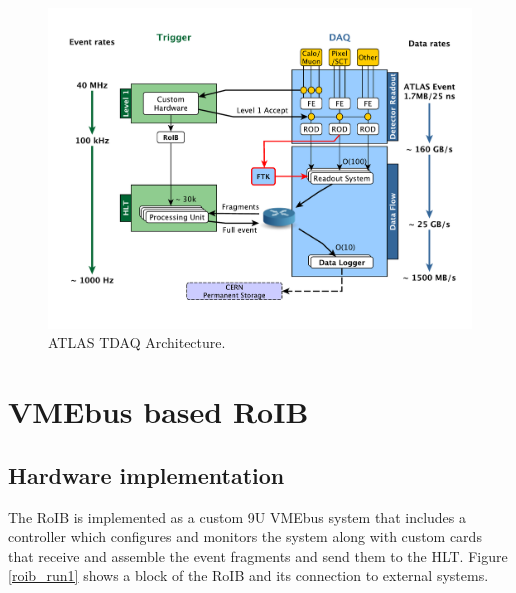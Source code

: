 \begin{figure}[tbp] %
\centering
\includegraphics[width=.9\textwidth]{tdaqFullNew2015}
\caption{ATLAS TDAQ Architecture.}
\label{fig:atlas_tdaq}
\end{figure}







\section{VMEbus based RoIB}\label{sec:roib}

\subsection{Hardware implementation}\label{sec:roib_current}

The RoIB is implemented as a custom 9U VMEbus system that includes a controller which configures and monitors the system along with custom cards 
that receive and assemble the event fragments and send them to the HLT. Figure \ref{roib_run1} shows a block of the RoIB and 
its connection to external systems.

